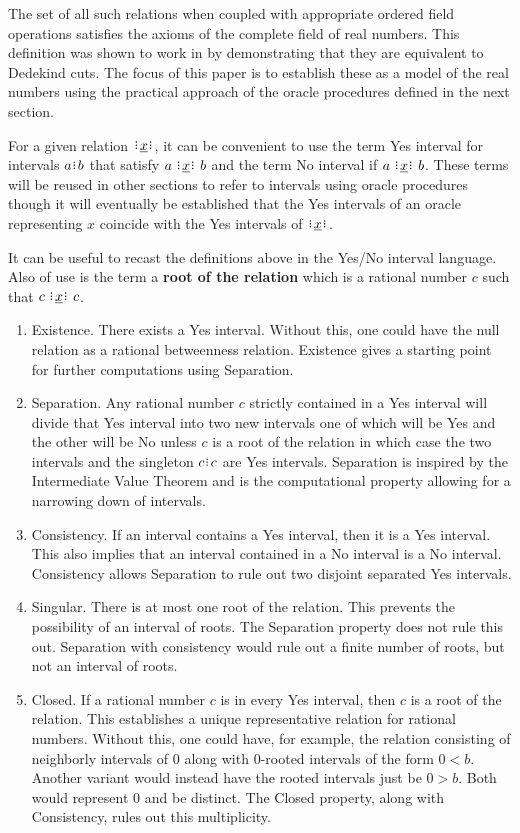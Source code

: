 \documentclass[12pt]{article}
\begin{document}
The set of all such relations when coupled with appropriate ordered field operations satisfies the axioms of the complete field of real numbers. This definition was shown to work in \cite{taylor24dedekind} by demonstrating that they are equivalent to Dedekind cuts. The focus of this paper is to establish these as a model of the real numbers using the practical approach of the oracle procedures defined in the next section. 

For a given relation $\xrel$, it can be convenient to use the term Yes interval for intervals $a\rint b$ that satisfy $a \xrel b$ and the term No interval if \sout{$ a \xrel b$}. These terms will be reused in other sections to refer to intervals using oracle procedures though it will eventually be established that the Yes intervals of an oracle representing $x$ coincide with the Yes intervals of $\xrel$.

It can be useful to recast the definitions above in the Yes/No interval language. Also of use is the term a \textbf{root of the relation} which is a rational number $c$ such that $c \xrel c$.

\begin{enumerate}
    \item Existence. There exists a Yes interval. Without this, one could have the null relation as a rational betweenness relation. Existence gives a starting point for further computations using Separation. 
    \item Separation. Any rational number $c$ strictly contained in a Yes interval will divide that Yes interval into two new intervals one of which will be Yes and the other will be No unless $c$ is a root of the relation in which case the two intervals and the singleton $c\rint c$ are Yes intervals. Separation is inspired by the Intermediate Value Theorem and is the computational property allowing for a narrowing down of intervals. 
    \item Consistency. If an interval contains a Yes interval, then it is a Yes interval. This also implies that an interval contained in a No interval is a No interval. Consistency allows Separation to rule out two disjoint separated Yes intervals. 
    \item Singular. There is at most one root of the relation. This prevents the possibility of an interval of roots. The Separation property does not rule this out. Separation with consistency would rule out a finite number of roots, but not an interval of roots.  
    \item Closed. If a rational number $c$ is in every Yes interval, then $c$ is a root of the relation. This establishes a unique representative relation for rational numbers. Without this, one could have, for example, the relation consisting of neighborly intervals of $0$ along with $0$-rooted intervals of the form $0 \lt b$. Another variant would instead have the rooted intervals just be $0 \gt b$. Both would represent $0$ and be distinct. The Closed property, along with Consistency, rules out this multiplicity. 
\end{enumerate}
\end{document}

